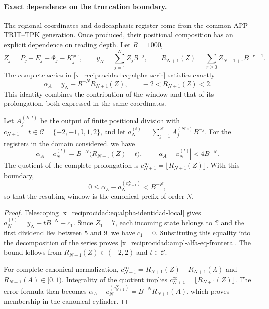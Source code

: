 

\paragraph{Exact dependence on the truncation boundary.}
\label{x_reciprocidad:ampl-alfa-frontera-exacta}
The regional coordinates and dodecaphasic register come from the
common APP--TRIT--TPK generation. Once produced, their positional
composition has an explicit dependence on reading
depth. Let $B=1000$,
\[
 Z_j=P_j+E_j-\Phi_j-K_j^{\mathrm{per}},\qquad
 y_N=\sum_{j=1}^{N}Z_jB^{-j},\qquad
 R_{N+1}(Z)=\sum_{r\geq0}Z_{N+1+r}B^{-r-1}.
\]
The complete series in \eqref{x_reciprocidad:eq:alpha-serie} satisfies exactly
\[
 \alpha_A=y_N+B^{-N}R_{N+1}(Z),\qquad
 -2<R_{N+1}(Z)<2.
\]
This identity combines the contribution of the window and that of its
prolongation, both expressed in the same coordinates.

\begin{proposition}
\label{x_reciprocidad:ampl-alfa-prop-frontera}
Let $A_j^{(N,t)}$ be the output of finite positional division with
$c_{N+1}=t\in\mathcal C=\{-2,-1,0,1,2\}$, and let
$a_N^{(t)}=\sum_{j=1}^{N}A_j^{(N,t)}B^{-j}$. For the registers in the
domain considered, we have
\begin{equation}
 \alpha_A-a_N^{(t)}
 =B^{-N}\bigl(R_{N+1}(Z)-t\bigr),
 \qquad
 |\alpha_A-a_N^{(t)}|<4B^{-N}.
 \label{x_reciprocidad:ampl-alfa-eq-frontera}
\end{equation}
The quotient of the complete prolongation is
$c_{N+1}^{\infty}=\lfloor R_{N+1}(Z)\rfloor$. With this boundary,
\[
 0\leq\alpha_A-a_N^{(c_{N+1}^{\infty})}<B^{-N},
\]
so that the resulting window is the canonical prefix of order $N$.
\end{proposition}
\begin{proof}
Telescoping \eqref{x_reciprocidad:eq:alpha-identidad-local} gives
$a_N^{(t)}=y_N+tB^{-N}-c_1$. Since $Z_1=7$, each incoming state
belongs to $\mathcal C$ and the first dividend lies between $5$ and $9$,
we have $c_1=0$. Substituting this equality into the decomposition of the
series proves \eqref{x_reciprocidad:ampl-alfa-eq-frontera}. The bound follows from
$R_{N+1}(Z)\in(-2,2)$ and $t\in\mathcal C$.

For complete canonical normalization,
$c_{N+1}^{\infty}=R_{N+1}(Z)-R_{N+1}(A)$ and
$R_{N+1}(A)\in[0,1)$. Integrality of the quotient implies
$c_{N+1}^{\infty}=\lfloor R_{N+1}(Z)\rfloor$. The error formula
then becomes
$\alpha_A-a_N^{(c_{N+1}^{\infty})}=B^{-N}R_{N+1}(A)$, which proves
membership in the canonical cylinder.
\end{proof}


